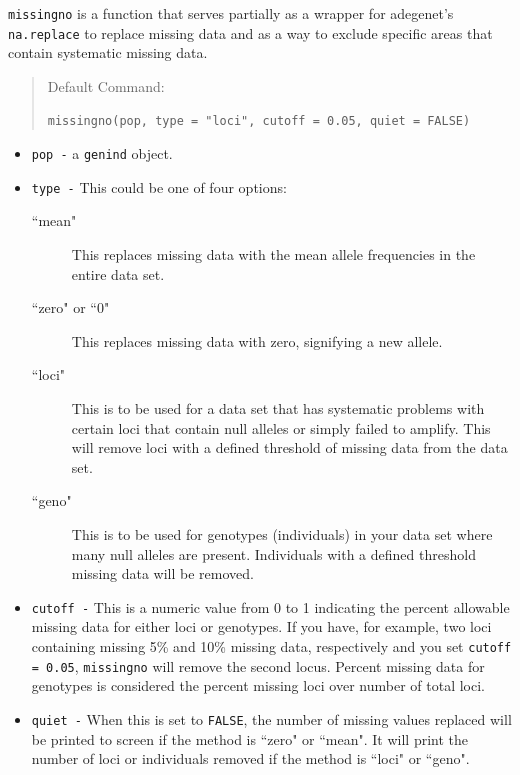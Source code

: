 \documentclass[letterpaper]{article}\usepackage[]{graphicx}\usepackage[]{color}
\makeatletter
\newenvironment{kframe}{%
 \def\at@end@of@kframe{}%
 \ifinner\ifhmode%
  \def\at@end@of@kframe{\end{minipage}}%
  \begin{minipage}{\columnwidth}%
 \fi\fi%
 \def\FrameCommand##1{\hskip\@totalleftmargin \hskip-\fboxsep
 \colorbox{shadecolor}{##1}\hskip-\fboxsep
     \hskip-\linewidth \hskip-\@totalleftmargin \hskip\columnwidth}%
 \MakeFramed {\advance\hsize-\width
   \@totalleftmargin\z@ \linewidth\hsize
   \@setminipage}}%
 {\par\unskip\endMakeFramed%
 \at@end@of@kframe}
\newenvironment{knitrout}{}{} %
\newcommand{\tab}{\hspace*{1em}}
\makeatother
\begin{document}
\tab\tab \texttt{missingno} is a function that serves partially as a wrapper for adegenet's \texttt{na.replace} to replace missing data and as a way to exclude specific areas that contain systematic missing data.  
\begin{quote}
Default Command:
\begin{knitrout}
\color{fgcolor}\begin{kframe}
\begin{verbatim}
missingno(pop, type = "loci", cutoff = 0.05, quiet = FALSE)
\end{verbatim}
\end{kframe}
\end{knitrout}

\end{quote}
\begin{itemize}
  \item \texttt{pop -} a \texttt{genind} object.
  \item \texttt{type -} This could be one of four options:
    \begin{description}
      \item[ ``mean"] This replaces missing data with the mean allele frequencies in the entire data set.
      \item[ ``zero" or ``0"] This replaces missing data with zero, signifying a new allele.
      \item[ ``loci"] This is to be used for a data set that has systematic problems with certain loci that contain null alleles or simply failed to amplify. This will remove loci with a defined threshold of missing data from the data set.
      \item[ ``geno"] This is to be used for genotypes (individuals) in your data set where many null alleles are present. Individuals with a defined threshold missing data will be removed.
    \end{description}
    \item \texttt{cutoff -} This is a numeric value from 0 to 1 indicating the percent allowable missing data for either loci or genotypes. If you have, for example, two loci containing missing 5\% and 10\% missing data, respectively and you set \texttt{cutoff = 0.05}, \texttt{missingno} will remove the second locus. Percent missing data for genotypes is considered the percent missing loci over number of total loci. 
    \item \texttt{quiet -} When this is set to \texttt{FALSE}, the number of missing values replaced will be printed to screen if the method is ``zero" or ``mean". It will print the number of loci or individuals removed if the method is ``loci" or ``geno".
\end{itemize}
\end{document}
